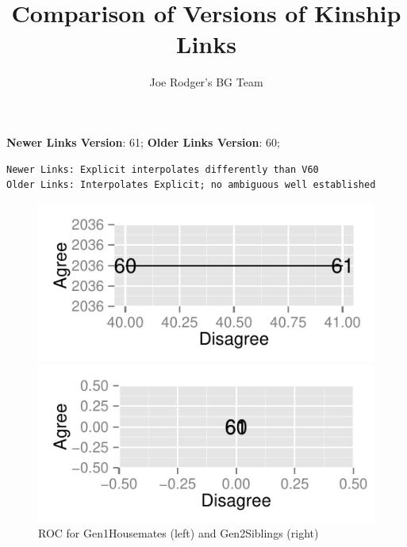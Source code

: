 \documentclass[a4paper]{article}\usepackage{graphicx, color}
\title{Comparison of Versions of Kinship Links}
\author{Joe Rodger's BG Team}
\makeatletter
\def\maxwidth{ %
  \ifdim\Gin@nat@width>\linewidth
    \linewidth
  \else
    \Gin@nat@width
  \fi
}
\newenvironment{kframe}{%
 \def\at@end@of@kframe{}%
 \ifinner\ifhmode%
  \def\at@end@of@kframe{\end{minipage}}%
  \begin{minipage}{\columnwidth}%
 \fi\fi%
 \def\FrameCommand##1{\hskip\@totalleftmargin \hskip-\fboxsep
 \colorbox{shadecolor}{##1}\hskip-\fboxsep
     \hskip-\linewidth \hskip-\@totalleftmargin \hskip\columnwidth}%
 \MakeFramed {\advance\hsize-\width
   \@totalleftmargin\z@ \linewidth\hsize
   \@setminipage}}%
 {\par\unskip\endMakeFramed%
 \at@end@of@kframe}
\newenvironment{knitrout}{}{} %
\makeatother
\begin{document}
\maketitle

\setlength{\parindent}{0pt}%







\textbf{Newer Links Version}: 61;
\textbf{Older Links Version}: 60;

\begin{knitrout}
\color{fgcolor}\begin{kframe}
\begin{verbatim}
Newer Links: Explicit interpolates differently than V60
Older Links: Interpolates Explicit; no ambiguous well established
\end{verbatim}
\end{kframe}
\end{knitrout}


\begin{figure}[htbp]
\begin{knitrout}
\color{fgcolor}
\includegraphics[width=\maxwidth]{figure/unnamed-chunk-31} 

\includegraphics[width=\maxwidth]{figure/unnamed-chunk-32} 

\end{knitrout}

\caption{ROC for Gen1Housemates (left) and Gen2Siblings (right)}
\end{figure}
\end{document}
